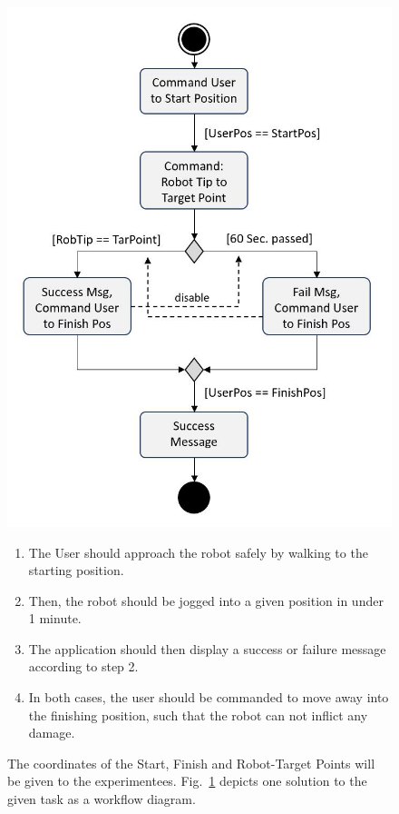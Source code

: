 \begin{figure}[!h]
	\begin{minipage}{0.4\textwidth}
		\centering
		\includegraphics[width=1\linewidth]{Figures/Evaluation2_workflow}
		\caption[Evaluation 2 UseCase Workflow]{}
		\label{Fig:Evaluation2Workflow}
	\end{minipage}\hfill
	\begin{minipage}{0.55\textwidth}
		\begin{enumerate}
			\item The User should approach the robot safely by walking to the starting position.
			\item Then, the robot should be jogged into a given position in under 1 minute.
			\item The application should then display a success or failure message according to step 2.
			\item In both cases, the user should be commanded to move away into the finishing position, such that the robot can not inflict any damage.
		\end{enumerate} 
		The coordinates of the Start, Finish and Robot-Target Points will be given to the experimentees. Fig.~\ref{Fig:Evaluation2Workflow} depicts one solution to the given task as a workflow diagram. 
	\end{minipage}
\end{figure}

